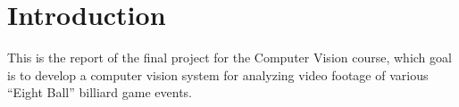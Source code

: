 \section{Introduction}
This is the report of the final project for the Computer Vision course, which goal is to develop a computer vision system for analyzing video footage of various “Eight Ball” billiard game events.
